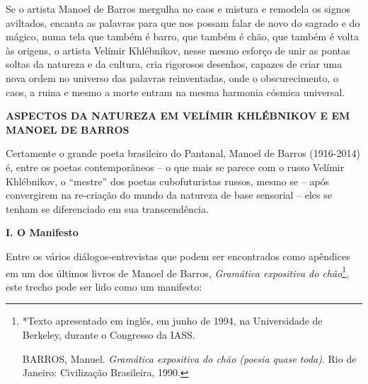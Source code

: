 Se o artista Manoel de Barros mergulha no caos e mistura e remodela os
signos aviltados, encanta as palavras para que nos possam falar de novo
do sagrado e do mágico, numa tela que também é barro, que também é chão,
que também é volta às origens, o artista Velímir Khlébnikov, nesse mesmo
esforço de unir as pontas soltas da natureza e da cultura, cria
rigorosos desenhos, capazes de criar uma nova ordem no universo das
palavras reinventadas, onde o obscurecimento, o caos, a ruina e mesmo a
morte entram na mesma harmonia cósmica universal.

\textbf{ASPECTOS DA NATUREZA EM VELÍMIR KHLÉBNIKOV E EM MANOEL DE
BARROS}

Certamente o grande poeta brasileiro do Pantanal, Manoel de Barros
(1916-2014) é, entre os poetas contemporâneos -- o que mais se parece
com o russo Velímir Khlébnikov, o ``mestre'' dos poetas cubofuturistas
russos, mesmo se -- após convergirem na re-criação do mundo da natureza
de base sensorial -- eles se tenham se diferenciado em sua
transcendência.

\textbf{I. O Manifesto}

Entre os vários diálogos-entrevistas que podem ser encontrados como
apêndices em um dos últimos livros de Manoel de Barros, \emph{Gramática
expositiva do chão}\footnote{*Texto apresentado em inglês, em junho de
  1994, na Universidade de Berkeley, durante o Congresso da IASS.

  BARROS, Manuel. \emph{Gramática expositiva do chão (poesia quase
  toda)}. Rio de Janeiro: Civilização Brasileira, 1990.}, este trecho
pode ser lido como um manifesto:


